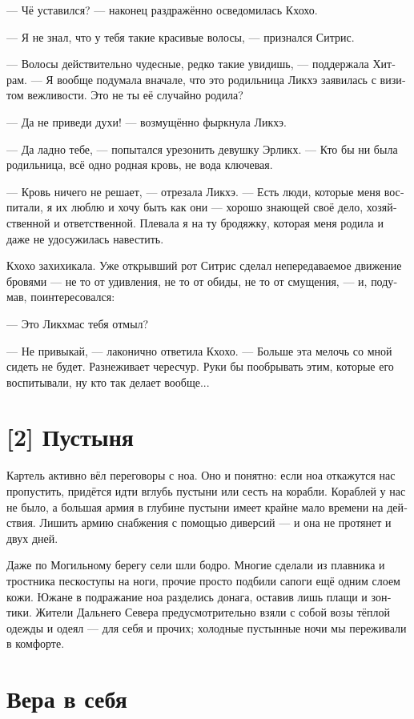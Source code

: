 \documentclass[a4paper,12pt,fleqn]{book}\usepackage{polyglossia}\setdefaultlanguage[babelshorthands=true]{russian}\setotherlanguage{english}\defaultfontfeatures{Ligatures=TeX,Mapping=tex-text}\usepackage{xcolor}\newcommand{\ml}[3]{#2}
\begin{document}
{--- Чё уставился? --- наконец раздражённо осведомилась Кхохо.

--- Я не знал, что у тебя такие красивые волосы, --- признался Ситрис.

--- Волосы действительно чудесные, редко такие увидишь, --- поддержала Хитрам.
--- Я вообще подумала вначале, что это родильница Ликхэ заявилась с визитом вежливости.
Это не ты её случайно родила?

--- Да не приведи духи! --- возмущённо фыркнула Ликхэ.

--- Да ладно тебе, --- попытался урезонить девушку Эрликх.
--- Кто бы ни была родильница, всё одно родная кровь, не вода ключевая.

--- Кровь ничего не решает, --- отрезала Ликхэ.
--- Есть люди, которые меня воспитали, я их люблю и хочу быть как они --- хорошо знающей своё дело, хозяйственной и ответственной.
Плевала я на ту бродяжку, которая меня родила и даже не удосужилась навестить.

Кхохо захихикала.
Уже открывший рот Ситрис сделал непередаваемое движение бровями --- не то от удивления, не то от обиды, не то от смущения, --- и, подумав, поинтересовался:

--- Это Ликхмас тебя отмыл?

--- Не привыкай, --- лаконично ответила Кхохо.
\ml{$0$}
{--- Больше эта мелочь со мной сидеть не будет.}
{``This smol shall never look after me.}
Разнеживает чересчур.
Руки бы пообрывать этим, которые его воспитывали, ну кто так делает вообще...

\section{[2] Пустыня}

Картель активно вёл переговоры с ноа.
Оно и понятно: если ноа откажутся нас пропустить, придётся идти вглубь пустыни или сесть на корабли.
Кораблей у нас не было, а большая армия в глубине пустыни имеет крайне мало времени на действия.
Лишить армию снабжения с помощью диверсий --- и она не протянет и двух дней.

Даже по Могильному берегу сели шли бодро.
Многие сделали из плавника и тростника пескоступы на ноги, прочие просто подбили сапоги ещё одним слоем кожи.
Южане в подражание ноа разделись донага, оставив лишь плащи и зонтики.
Жители Дальнего Севера предусмотрительно взяли с собой возы тёплой одежды и одеял --- для себя и прочих;
холодные пустынные ночи мы переживали в комфорте.

\section{Вера в себя}

}
\end{document}
